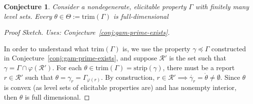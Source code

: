 \documentclass[12pt]{article}
\newcommand{\R}{\mathcal{R}}
\newcommand{\inter}[1]{\mathring{#1}}%
\newcommand{\trim}{\mathrm{trim}}
\newcommand{\strip}{\mathrm{strip}}
\newtheorem{conjecture}{Conjecture}
\begin{document}
\begin{conjecture}\label{conj:trim-full-dim}
	Consider a nondegenerate, elicitable property $\Gamma$ with finitely many level sets.
	Every $\theta \in \Theta := \trim(\Gamma)$ is full-dimensional  
\end{conjecture}

\begin{proof}[Proof Sketch]
	\emph{Uses: Conjecture~\ref{conj:gam-prime-exists}.}
	
	In order to understand what $\trim(\Gamma)$ is, we use the property $\gamma \preceq \Gamma$ constructed in Conjecture~\ref{conj:gam-prime-exists}, and suppose $\R'$ is the set such that $\gamma = \Gamma\cap \varphi(\R')$.
	For each $\theta \in \trim(\Gamma) = \strip(\gamma)$, there must be a report $r \in \R'$ such that $\theta = \gamma_r = \Gamma_{\varphi(r)}$.
	By construction, $r \in \R' \implies \inter{\gamma_r} = \inter{\theta} \neq \emptyset$.
	Since $\theta$ is convex (as level sets of elicitable properties are) and has nonempty interior, then $\theta$ is full dimensional. 
	

\end{proof}
\end{document}
